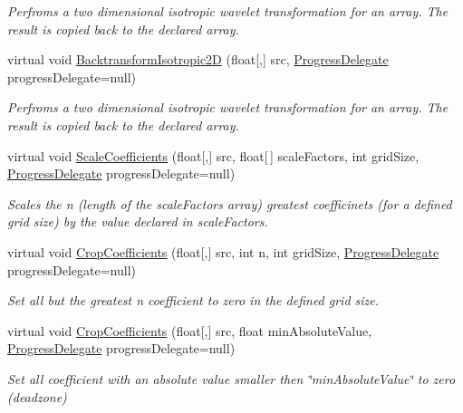 \begin{DoxyCompactItemize}
\begin{DoxyCompactList}\small\item\em \-Perfroms a two dimensional isotropic wavelet transformation for an array. \-The result is copied back to the declared array. \end{DoxyCompactList}\item 
virtual void \hyperlink{class_turbo_wavelets_1_1_wavelet2_d_ac1644fb0d5f8a2ba8f265b445cba454b}{\-Backtransform\-Isotropic2\-D} (float\mbox{[},\mbox{]} src, \hyperlink{class_turbo_wavelets_1_1_wavelet2_d_aec52fe74aa08e073119064ef4ac3fe93}{\-Progress\-Delegate} progress\-Delegate=null)
\begin{DoxyCompactList}\small\item\em \-Perfroms a two dimensional isotropic wavelet transformation for an array. \-The result is copied back to the declared array. \end{DoxyCompactList}\item 
virtual void \hyperlink{class_turbo_wavelets_1_1_wavelet2_d_a55e3f96cb79da6cc4621ccc1118a0d6f}{\-Scale\-Coefficients} (float\mbox{[},\mbox{]} src, float\mbox{[}$\,$\mbox{]} scale\-Factors, int grid\-Size, \hyperlink{class_turbo_wavelets_1_1_wavelet2_d_aec52fe74aa08e073119064ef4ac3fe93}{\-Progress\-Delegate} progress\-Delegate=null)
\begin{DoxyCompactList}\small\item\em \-Scales the n (length of the scale\-Factors array) greatest coefficinets (for a defined grid size) by the value declared in scale\-Factors. \end{DoxyCompactList}\item 
virtual void \hyperlink{class_turbo_wavelets_1_1_wavelet2_d_aa1e399d2ab5f85843185a2895bf7f7ad}{\-Crop\-Coefficients} (float\mbox{[},\mbox{]} src, int n, int grid\-Size, \hyperlink{class_turbo_wavelets_1_1_wavelet2_d_aec52fe74aa08e073119064ef4ac3fe93}{\-Progress\-Delegate} progress\-Delegate=null)
\begin{DoxyCompactList}\small\item\em \-Set all but the greatest n coefficient to zero in the defined grid size. \end{DoxyCompactList}\item 
virtual void \hyperlink{class_turbo_wavelets_1_1_wavelet2_d_a9abbbf0cffd0d8dca5d78d6ad4dad399}{\-Crop\-Coefficients} (float\mbox{[},\mbox{]} src, float min\-Absolute\-Value, \hyperlink{class_turbo_wavelets_1_1_wavelet2_d_aec52fe74aa08e073119064ef4ac3fe93}{\-Progress\-Delegate} progress\-Delegate=null)
\begin{DoxyCompactList}\small\item\em \-Set all coefficient with an absolute value smaller then \char`\"{}min\-Absolute\-Value\char`\"{} to zero (deadzone) \end{DoxyCompactList}\item 

\end{DoxyCompactItemize}
